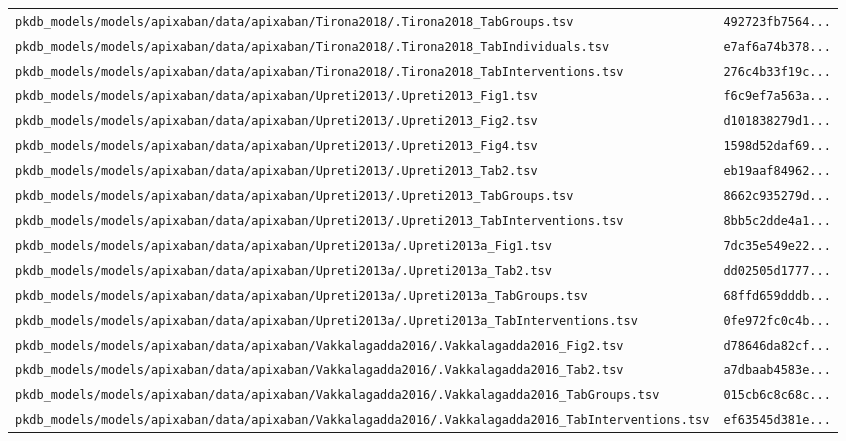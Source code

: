 \begin{longtable}{ll}
\texttt{pkdb\_models/models/apixaban/data/apixaban/Tirona2018/.Tirona2018\_TabGroups.tsv} & \texttt{492723fb7564...} \\
\texttt{pkdb\_models/models/apixaban/data/apixaban/Tirona2018/.Tirona2018\_TabIndividuals.tsv} & \texttt{e7af6a74b378...} \\
\texttt{pkdb\_models/models/apixaban/data/apixaban/Tirona2018/.Tirona2018\_TabInterventions.tsv} & \texttt{276c4b33f19c...} \\
\texttt{pkdb\_models/models/apixaban/data/apixaban/Upreti2013/.Upreti2013\_Fig1.tsv} & \texttt{f6c9ef7a563a...} \\
\texttt{pkdb\_models/models/apixaban/data/apixaban/Upreti2013/.Upreti2013\_Fig2.tsv} & \texttt{d101838279d1...} \\
\texttt{pkdb\_models/models/apixaban/data/apixaban/Upreti2013/.Upreti2013\_Fig4.tsv} & \texttt{1598d52daf69...} \\
\texttt{pkdb\_models/models/apixaban/data/apixaban/Upreti2013/.Upreti2013\_Tab2.tsv} & \texttt{eb19aaf84962...} \\
\texttt{pkdb\_models/models/apixaban/data/apixaban/Upreti2013/.Upreti2013\_TabGroups.tsv} & \texttt{8662c935279d...} \\
\texttt{pkdb\_models/models/apixaban/data/apixaban/Upreti2013/.Upreti2013\_TabInterventions.tsv} & \texttt{8bb5c2dde4a1...} \\
\texttt{pkdb\_models/models/apixaban/data/apixaban/Upreti2013a/.Upreti2013a\_Fig1.tsv} & \texttt{7dc35e549e22...} \\
\texttt{pkdb\_models/models/apixaban/data/apixaban/Upreti2013a/.Upreti2013a\_Tab2.tsv} & \texttt{dd02505d1777...} \\
\texttt{pkdb\_models/models/apixaban/data/apixaban/Upreti2013a/.Upreti2013a\_TabGroups.tsv} & \texttt{68ffd659dddb...} \\
\texttt{pkdb\_models/models/apixaban/data/apixaban/Upreti2013a/.Upreti2013a\_TabInterventions.tsv} & \texttt{0fe972fc0c4b...} \\
\texttt{pkdb\_models/models/apixaban/data/apixaban/Vakkalagadda2016/.Vakkalagadda2016\_Fig2.tsv} & \texttt{d78646da82cf...} \\
\texttt{pkdb\_models/models/apixaban/data/apixaban/Vakkalagadda2016/.Vakkalagadda2016\_Tab2.tsv} & \texttt{a7dbaab4583e...} \\
\texttt{pkdb\_models/models/apixaban/data/apixaban/Vakkalagadda2016/.Vakkalagadda2016\_TabGroups.tsv} & \texttt{015cb6c8c68c...} \\
\texttt{pkdb\_models/models/apixaban/data/apixaban/Vakkalagadda2016/.Vakkalagadda2016\_TabInterventions.tsv} & \texttt{ef63545d381e...} \\

\end{longtable}
